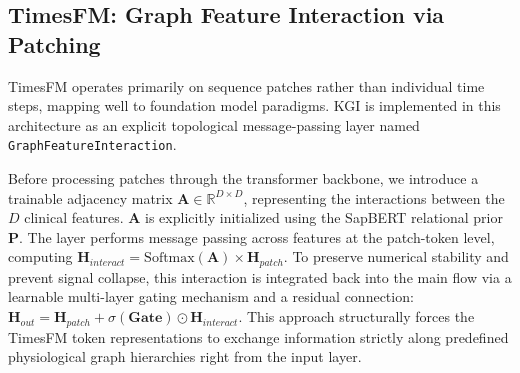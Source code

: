 \subsection{TimesFM: Graph Feature Interaction via Patching}
TimesFM operates primarily on sequence patches rather than individual time steps, mapping well to foundation model paradigms. KGI is implemented in this architecture as an explicit topological message-passing layer named \texttt{GraphFeatureInteraction}.

Before processing patches through the transformer backbone, we introduce a trainable adjacency matrix $\mathbf{A} \in \mathbb{R}^{D \times D}$, representing the interactions between the $D$ clinical features. $\mathbf{A}$ is explicitly initialized using the SapBERT relational prior $\mathbf{P}$. The layer performs message passing across features at the patch-token level, computing $\mathbf{H}_{interact} = \text{Softmax}(\mathbf{A}) \times \mathbf{H}_{patch}$. To preserve numerical stability and prevent signal collapse, this interaction is integrated back into the main flow via a learnable multi-layer gating mechanism and a residual connection: $\mathbf{H}_{out} = \mathbf{H}_{patch} + \sigma(\mathbf{Gate}) \odot \mathbf{H}_{interact}$. This approach structurally forces the TimesFM token representations to exchange information strictly along predefined physiological graph hierarchies right from the input layer.
